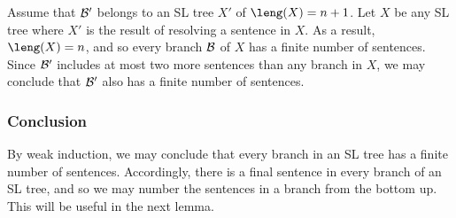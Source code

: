 Assume that $\mathcal{B}'$ belongs to an SL tree $X'$ of $\leng(X)=n+1$. 
Let $X$ be any SL tree where $X'$ is the result of resolving a sentence in $X$. 
As a result, $\leng(X)=n$, and so every branch $\mathcal{B}$ of $X$ has a finite number of sentences.
Since $\mathcal{B}'$ includes at most two more sentences than any branch in $X$, we may conclude that $\mathcal{B}'$ also has a finite number of sentences. 

\subsubsection{Conclusion}

By weak induction, we may conclude that every branch in an SL tree has a finite number of sentences.
Accordingly, there is a final sentence in every branch of an SL tree, and so we may number the sentences in a branch from the bottom up.
This will be useful in the next lemma.

%
%
%

